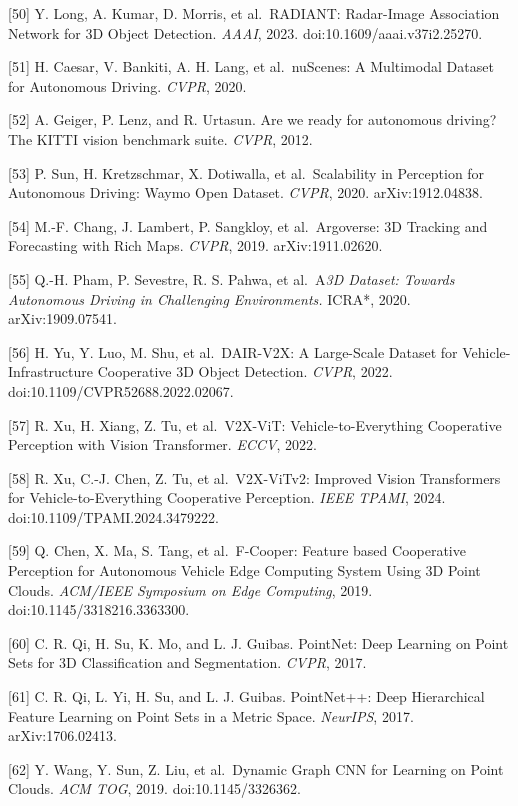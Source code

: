 {[}50{]} Y. Long, A. Kumar, D. Morris, et al.~RADIANT: Radar-Image Association Network for 3D Object Detection. \emph{AAAI}, 2023. doi:10.1609/aaai.v37i2.25270.

{[}51{]} H. Caesar, V. Bankiti, A. H. Lang, et al.~nuScenes: A Multimodal Dataset for Autonomous Driving. \emph{CVPR}, 2020.

{[}52{]} A. Geiger, P. Lenz, and R. Urtasun. Are we ready for autonomous driving? The KITTI vision benchmark suite. \emph{CVPR}, 2012.

{[}53{]} P. Sun, H. Kretzschmar, X. Dotiwalla, et al.~Scalability in Perception for Autonomous Driving: Waymo Open Dataset. \emph{CVPR}, 2020. arXiv:1912.04838.

{[}54{]} M.-F. Chang, J. Lambert, P. Sangkloy, et al.~Argoverse: 3D Tracking and Forecasting with Rich Maps. \emph{CVPR}, 2019. arXiv:1911.02620.

{[}55{]} Q.-H. Pham, P. Sevestre, R. S. Pahwa, et al.~A\emph{3D Dataset: Towards Autonomous Driving in Challenging Environments. }ICRA*, 2020. arXiv:1909.07541.

{[}56{]} H. Yu, Y. Luo, M. Shu, et al.~DAIR-V2X: A Large-Scale Dataset for Vehicle-Infrastructure Cooperative 3D Object Detection. \emph{CVPR}, 2022. doi:10.1109/CVPR52688.2022.02067.

{[}57{]} R. Xu, H. Xiang, Z. Tu, et al.~V2X-ViT: Vehicle-to-Everything Cooperative Perception with Vision Transformer. \emph{ECCV}, 2022.

{[}58{]} R. Xu, C.-J. Chen, Z. Tu, et al.~V2X-ViTv2: Improved Vision Transformers for Vehicle-to-Everything Cooperative Perception. \emph{IEEE TPAMI}, 2024. doi:10.1109/TPAMI.2024.3479222.

{[}59{]} Q. Chen, X. Ma, S. Tang, et al.~F-Cooper: Feature based Cooperative Perception for Autonomous Vehicle Edge Computing System Using 3D Point Clouds. \emph{ACM/IEEE Symposium on Edge Computing}, 2019. doi:10.1145/3318216.3363300.

{[}60{]} C. R. Qi, H. Su, K. Mo, and L. J. Guibas. PointNet: Deep Learning on Point Sets for 3D Classification and Segmentation. \emph{CVPR}, 2017.

{[}61{]} C. R. Qi, L. Yi, H. Su, and L. J. Guibas. PointNet++: Deep Hierarchical Feature Learning on Point Sets in a Metric Space. \emph{NeurIPS}, 2017. arXiv:1706.02413.

{[}62{]} Y. Wang, Y. Sun, Z. Liu, et al.~Dynamic Graph CNN for Learning on Point Clouds. \emph{ACM TOG}, 2019. doi:10.1145/3326362.

